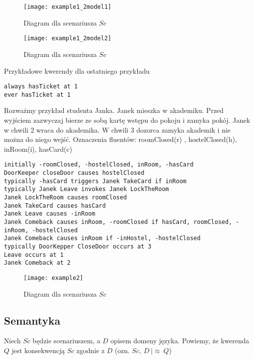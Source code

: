 \begin{figure}[h!]
	\centering
	\texttt{[image: example1\_2model1]}
	\caption{Diagram dla scenariusza $Sc$}
	\label{PicSC2}
\end{figure}

\begin{figure}[h!]
	\centering
	\texttt{[image: example1\_2model2]}
	\caption{Diagram dla scenariusza $Sc$}
	\label{PicSC3}
\end{figure}

Przykładowe kwerendy dla ostatniego przykładu

	\begin{lstlisting}
always hasTicket at 1
ever hasTicket at 1
	\end{lstlisting}

Rozważmy przykład studenta Janka. Janek mieszka w akademiku. Przed wyjściem zazwyczaj
bierze ze sobą kartę wstępu do pokoju i zamyka pokój. Janek w chwili 2 wraca do akademika.
W chwili 3 dozorca zamyka akademik i nie można do niego wejść.
Oznaczenia fluentów: roomClosed(r) , hostelClosed(h), inRoom(i), hasCard(c)

	\begin{lstlisting}
initially -roomClosed, -hostelClosed, inRoom, -hasCard
DoorKeeper closeDoor causes hostelClosed
typically -hasCard triggers Janek TakeCard if inRoom
typically Janek Leave invokes Janek LockTheRoom
Janek LockTheRoom causes roomClosed
Janek TakeCard causes hasCard
Janek Leave causes -inRoom
Janek Comeback causes inRoom, -roomClosed if hasCard, roomClosed, -inRoom, -hostelClosed
Janek Comeback causes inRoom if -inHostel, -hostelClosed
typically DoorKepper CloseDoor occurs at 3
Leave occurs at 1
Janek Comeback at 2
	\end{lstlisting}

\begin{figure}[h!]
	\centering
	\texttt{[image: example2]}
	\caption{Diagram dla scenariusza $Sc$}
	\label{PicSC4}
\end{figure}

\subsection{Semantyka}
Niech $Sc$ będzie scenariuszem, a $D$ opisem domeny języka. Powiemy, że kwerenda $Q$ jest konsekwencją
$Sc$ zgodnie z $D$ (ozn. $Sc,\ D\ |\approx\ Q $)

